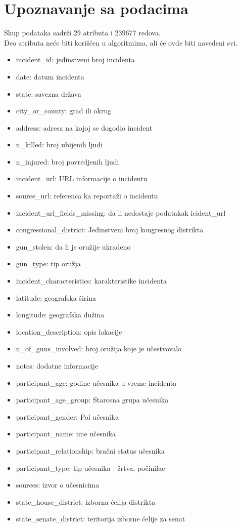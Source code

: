 \documentclass[
	12pt,			
	openright,		
	oneside,			
	a4paper,		
	english,			
	]{article}
\begin{document}
\newpage
\section{Upoznavanje sa podacima}
Skup podataka sadrži 29 atributa i 239677 redova. \\
Deo atributa neće biti korišćen u algoritmima, ali će ovde biti navedeni svi.
\begin{multicols}{2}
\begin{itemize}
    \item {incident\_id: jedinstveni broj incidenta}
    \item date: datum incidenta
    \item state: savezna država 
    \item city\_or\_county: grad ili okrug
    \item address: adresa na kojoj se dogodio incident
    \item n\_killed: broj ubijenih ljudi
    \item n\_injured: broj povredjenih ljudi
    \item incident\_url: URL informacije o incidentu
    \item source\_url: referenca ka reportaži o incidentu
    \item incident\_url\_fields\_missing: da li nedostaje podatakak icident\_url
    \item congressional\_district: Jedinstveni broj kongresnog distrikta
    \item gun\_stolen: da li je oružije ukradeno
    \item gun\_type: tip oružja
    \item incident\_characteristics: karakteristike incidenta
    \item latitude: geografska širina
    \item longitude: geografska dužina
    \item location\_description: opis lokacije
    \item n\_of\_guns\_involved: broj oružija koje je učestvovalo
    \item notes: dodatne informacije 
    \item participant\_age: godine učesnika u vreme incidenta
    \item participant\_age\_group: Starosna grupa učesnika
    \item participant\_gender: Pol učesnika
    \item participant\_name: ime učesnika
    \item participant\_relationship: bračni status učesnika
    \item participant\_type: tip učesnika - žrtva, počinilac
    \item sources: izvor o učesnicima
    \item state\_house\_district: izborna ćelija distrikta
    \item state\_senate\_district: teritorija izborne ćelije za senat
\end{itemize}
\end{multicols}
\end{document}
